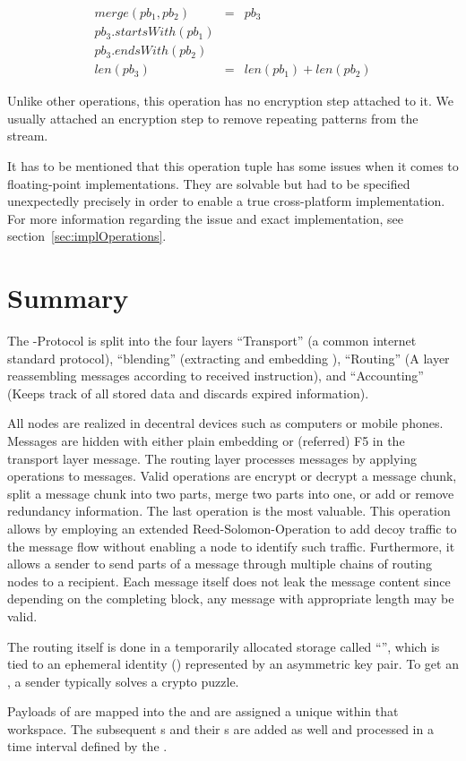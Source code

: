 \begin{eqnarray}
merge(pb_1, pb_2) & = & pb_3 \\
pb_3.startsWith(pb_1)\\
pb_3.endsWith(pb_2)\\
len(pb_3) & = & len(pb_1) + len(pb_2)
\end{eqnarray}

Unlike other operations, this operation has no encryption step attached to it. We usually attached an encryption step to remove repeating patterns from the \VortexMessage stream.

It has to be mentioned that this operation tuple has some issues when it comes to floating-point implementations. They are solvable but had to be specified unexpectedly precisely in order to enable a true cross-platform implementation. For more information regarding the issue and exact implementation, see section~\ref{sec:implOperations}.


\section{Summary}
The \MessageVortex{}-Protocol is split into the four layers ``Transport'' (a common internet standard protocol), ``blending'' (extracting and embedding \VortexMessages), ``Routing'' (A layer reassembling messages according to received instruction), and ``Accounting'' (Keeps track of all stored data and discards expired information).

All nodes are realized in decentral devices such as computers or mobile phones. Messages are hidden with either plain embedding or (referred) F5 in the transport layer message. The routing layer processes messages by applying operations to messages. Valid operations are encrypt or decrypt a message chunk, split a message chunk into two parts, merge two parts into one, or add or remove redundancy information. The last operation is the most valuable. This operation allows by employing an extended Reed-Solomon-Operation to add decoy traffic to the message flow without enabling a node to identify such traffic. Furthermore, it allows a sender to send parts of a message through multiple chains of routing nodes to a recipient. Each message itself does not leak the message content since depending on the completing block, any message with appropriate length may be valid.

The routing itself is done in a temporarily allocated storage called ``'', which is tied to an ephemeral identity () represented by an asymmetric key pair. To get an , a sender typically solves a crypto puzzle. 

Payloads of \VortexMessages{} are mapped into the  and are assigned a unique  within that workspace. The subsequent s and their s are added as well and processed in a time interval defined by the .

